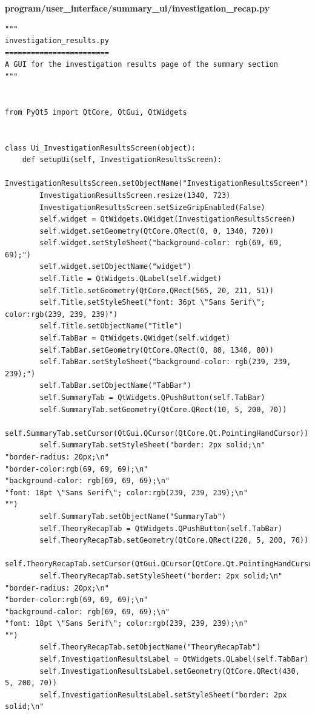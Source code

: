 \documentclass{article}
\begin{document}
\textbf{program/user\_interface/summary\_ui/investigation\_recap.py}
\begin{lstlisting}
"""
investigation_results.py
========================
A GUI for the investigation results page of the summary section
"""


from PyQt5 import QtCore, QtGui, QtWidgets


class Ui_InvestigationResultsScreen(object):
    def setupUi(self, InvestigationResultsScreen):
        InvestigationResultsScreen.setObjectName("InvestigationResultsScreen")
        InvestigationResultsScreen.resize(1340, 723)
        InvestigationResultsScreen.setSizeGripEnabled(False)
        self.widget = QtWidgets.QWidget(InvestigationResultsScreen)
        self.widget.setGeometry(QtCore.QRect(0, 0, 1340, 720))
        self.widget.setStyleSheet("background-color: rgb(69, 69, 69);")
        self.widget.setObjectName("widget")
        self.Title = QtWidgets.QLabel(self.widget)
        self.Title.setGeometry(QtCore.QRect(565, 20, 211, 51))
        self.Title.setStyleSheet("font: 36pt \"Sans Serif\"; color:rgb(239, 239, 239)")
        self.Title.setObjectName("Title")
        self.TabBar = QtWidgets.QWidget(self.widget)
        self.TabBar.setGeometry(QtCore.QRect(0, 80, 1340, 80))
        self.TabBar.setStyleSheet("background-color: rgb(239, 239, 239);")
        self.TabBar.setObjectName("TabBar")
        self.SummaryTab = QtWidgets.QPushButton(self.TabBar)
        self.SummaryTab.setGeometry(QtCore.QRect(10, 5, 200, 70))
        self.SummaryTab.setCursor(QtGui.QCursor(QtCore.Qt.PointingHandCursor))
        self.SummaryTab.setStyleSheet("border: 2px solid;\n"
"border-radius: 20px;\n"
"border-color:rgb(69, 69, 69);\n"
"background-color: rgb(69, 69, 69);\n"
"font: 18pt \"Sans Serif\"; color:rgb(239, 239, 239);\n"
"")
        self.SummaryTab.setObjectName("SummaryTab")
        self.TheoryRecapTab = QtWidgets.QPushButton(self.TabBar)
        self.TheoryRecapTab.setGeometry(QtCore.QRect(220, 5, 200, 70))
        self.TheoryRecapTab.setCursor(QtGui.QCursor(QtCore.Qt.PointingHandCursor))
        self.TheoryRecapTab.setStyleSheet("border: 2px solid;\n"
"border-radius: 20px;\n"
"border-color:rgb(69, 69, 69);\n"
"background-color: rgb(69, 69, 69);\n"
"font: 18pt \"Sans Serif\"; color:rgb(239, 239, 239);\n"
"")
        self.TheoryRecapTab.setObjectName("TheoryRecapTab")
        self.InvestigationResultsLabel = QtWidgets.QLabel(self.TabBar)
        self.InvestigationResultsLabel.setGeometry(QtCore.QRect(430, 5, 200, 70))
        self.InvestigationResultsLabel.setStyleSheet("border: 2px solid;\n"

\end{lstlisting}
\end{document}

